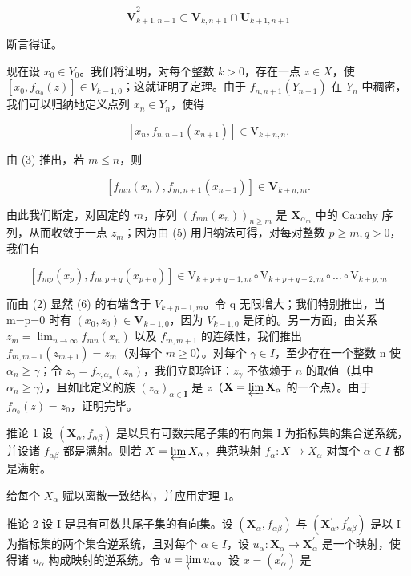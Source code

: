 \[
\mathbf {\dot {V}} _ {k + 1, n + 1} ^ {2} \subset \mathbf {V} _ {k, n + 1} \cap \mathbf {U} _ {k + 1, n + 1}
\]

断言得证。

现在设 \(x_0 \in Y_0\)。我们将证明，对每个整数 \(k > 0\)，存在一点 \(z \in X\)，使 \([x_0, f_{\alpha_0}(z)] \in V_{k-1,0}\)；这就证明了定理。由于 \(f_{n,n+1}(Y_{n+1})\) 在 \(Y_n\) 中稠密，我们可以归纳地定义点列 \(x_n \in Y_n\)，使得

\[
\left[ x _ {n}, f _ {n, n + 1} \left(x _ {n + 1}\right) \right] \in \mathrm{V} _ {k + n, n}.\tag{4}
\]

由 (3) 推出，若 \(m \leqslant n\)，则

\[
\left[ f _ {m n} (x _ {n}), f _ {m, n + 1} (x _ {n + 1}) \right] \in \mathbf {V} _ {k + n, m}.\tag{5}
\]

由此我们断定，对固定的 \(m\)，序列 \((f_{mn}(x_n))_{n\geqslant m}\) 是 \(\mathbf{X}_{\alpha_m}\) 中的 Cauchy 序列，从而收敛于一点 \(z_m\)；因为由 (5) 用归纳法可得，对每对整数 \(p\geqslant m,q > 0\)，我们有

\[
\left[ f _ {m p} (x _ {p}), f _ {m, p + q} (x _ {p + q}) \right] \in \mathrm{V} _ {k + p + q - 1, m} \circ \mathrm{V} _ {k + p + q - 2, m} \circ \dots \circ \mathrm{V} _ {k + p, m}\tag{6}
\]

而由 (2) 显然 (6) 的右端含于 \(V_{k+p-1,m}\)。令 q 无限增大；我们特别推出，当 m=p=0 时有 \((x_{0},z_{0})\in\mathbf{V}_{k-1,0}\)，因为 \(V_{k-1,0}\) 是闭的。另一方面，由关系 \(z_{m}=\lim_{n\to\infty}f_{mn}(x_{n})\) 以及 \(f_{m,m+1}\) 的连续性，我们推出 \(f_{m,m+1}(z_{m+1})=z_{m}\)（对每个 \(m\geqslant0\)）。对每个 \(\gamma\in I\)，至少存在一个整数 n 使 \(\alpha_{n}\geqslant\gamma\)；令 \(z_{\gamma} = f_{\gamma, \alpha_n}(z_n)\)，我们立即验证：\(z_{\gamma}\) 不依赖于 \(n\) 的取值（其中 \(\alpha_n \geqslant \gamma\)），且如此定义的族 \((z_\alpha)_{\alpha \in \mathbf{I}}\) 是 \(z\)（\(\mathbf{X} = \varprojlim \mathbf{X}_\alpha\) 的一个点）。由于 \(f_{\alpha_0}(z) = z_0\)，证明完毕。

推论 1 设 \((\mathbf{X}_{\alpha}, f_{\alpha\beta})\) 是以具有可数共尾子集的有向集 I 为指标集的集合逆系统，并设诸 \(f_{\alpha\beta}\) 都是满射。则若 \(X = \varprojlim X_{\alpha}\)，典范映射 \(f_{\alpha}: X \to X_{\alpha}\) 对每个 \(\alpha \in I\) 都是满射。

给每个 \(X_{\alpha}\) 赋以离散一致结构，并应用定理 1。

推论 2 设 I 是具有可数共尾子集的有向集。设 \((\mathbf{X}_{\alpha}, f_{\alpha \beta})\) 与 \((\mathbf{X}_{\alpha}^{\prime}, f_{\alpha \beta}^{\prime})\) 是以 I 为指标集的两个集合逆系统，且对每个 \(\alpha \in I\)，设 \(u_{\alpha}: \mathbf{X}_{\alpha} \to \mathbf{X}_{\alpha}^{\prime}\) 是一个映射，使得诸 \(u_{\alpha}\) 构成映射的逆系统。令 \(u = \varprojlim u_{\alpha}\)。设 \(x = (x_{\alpha}^{\prime})\) 是


